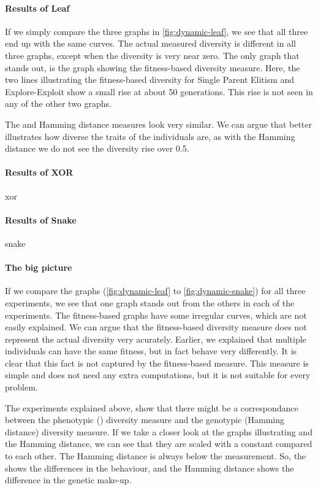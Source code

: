 \paragraph{Results of Leaf} If we simply compare the three graphs in \cref{fig:dynamic-leaf}, we see that all three end up with the same curves. The actual measured diversity is different in all three graphs, except when the diversity is very near zero. The only graph that stands out, is the graph showing the fitness-based diversity measure. Here, the two lines illustrating the fitness-based diversity for Single Parent Elitism and Explore-Exploit show a small rise at about \num{50} generations. This rise is not seen in any of the other two graphs. 

The \dia{} and Hamming distance measures look very similar. We can argue that \dia{} better illustrates how diverse the traits of the individuals are, as with the Hamming distance we do not see the diversity rise over \num{0.5}. 

\paragraph{Results of XOR} xor

\paragraph{Results of Snake} snake

\paragraph{The big picture} If we compare the graphs (\cref{fig:dynamic-leaf} to \cref{fig:dynamic-snake}) for all three experiments, we see that one graph stands out from the others in each of the experiments. The fitness-based graphs have some irregular curves, which are not easily explained. We can argue that the fitness-based diversity measure does not represent the actual diversity very acurately. Earlier, we explained that multiple individuals can have the same fitness, but in fact behave very differently. It is clear that this fact is not captured by the fitness-based measure. This measure is simple and does not need any extra computations, but it is not suitable for every problem. 

The experiments explained above, show that there might be a correspondance between the phenotypic (\dia{}) diversity measure and the genotypic (Hamming distance) diversity measure. If we take a closer look at the graphs illustrating \dia{} and the Hamming distance, we can see that they are scaled with a constant compared to each other. The Hamming distance is always below the \dia{} measurement. So, the \dia{} shows the differences in the behaviour, and the Hamming distance shows the difference in the genetic make-up.  

